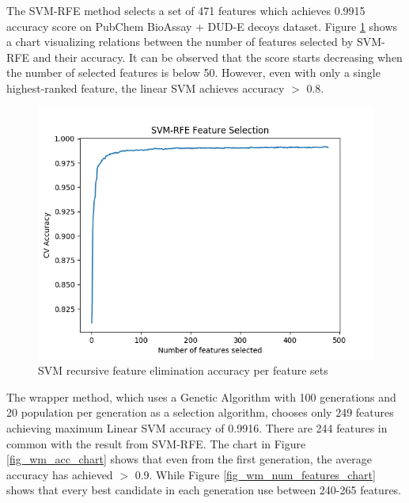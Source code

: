 \documentclass[conference]{IEEEtran}
\begin{document}
The SVM-RFE method selects a set of 471 features which achieves 0.9915 accuracy score on PubChem BioAssay + DUD-E decoys dataset. Figure \ref{fig_svmrfe_acc_num_features_chart} shows a chart visualizing relations between the number of features selected by SVM-RFE and their accuracy. It can be observed that the score starts decreasing when the number of selected features is below 50. However, even with only a single highest-ranked feature, the linear SVM achieves accuracy $>$ 0.8.

\begin{figure}
	\centering	
	\includegraphics[scale=0.45]{../images/SVM_RFE_chart.png}
	\caption{SVM recursive feature elimination accuracy per feature sets}
	\label{fig_svmrfe_acc_num_features_chart}
\end{figure}

The wrapper method, which uses a Genetic Algorithm with 100 generations and 20 population per generation as a selection algorithm, chooses only 249 features achieving maximum Linear SVM accuracy of 0.9916. There are 244 features in common with the result from SVM-RFE. The chart in Figure \ref{fig_wm_acc_chart} shows that even from the first generation, the average accuracy has achieved $>$ 0.9. While Figure \ref{fig_wm_num_features_chart} shows that every best candidate in each generation use between 240-265 features.
\end{document}
